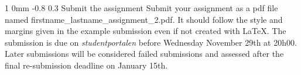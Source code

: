 \documentclass[11pt]{article}
\makeatletter
\newcommand{\newsec}[1]{\section{#1}\noindent}
\renewcommand{\section}{\@startsection
{section}%
{1}%
{0mm}%
{-0.8\baselineskip}%
{0.3\baselineskip}%
{\bfseries\large}}%
\makeatother
\begin{document}
\section{Submit the assignment}
\noindent
Submit your assignment as a pdf file named
firstname\_lastname\_assignment\_2.pdf. It should follow the style and
margins given in the example submission even if not created with
LaTeX. The submission is due on \textit{studentportalen} before
Wednesday November 29th at 20h00. Later submissions will be considered
failed submissions and assessed after the final re-submission deadline
on January 15th.%



\end{document}

